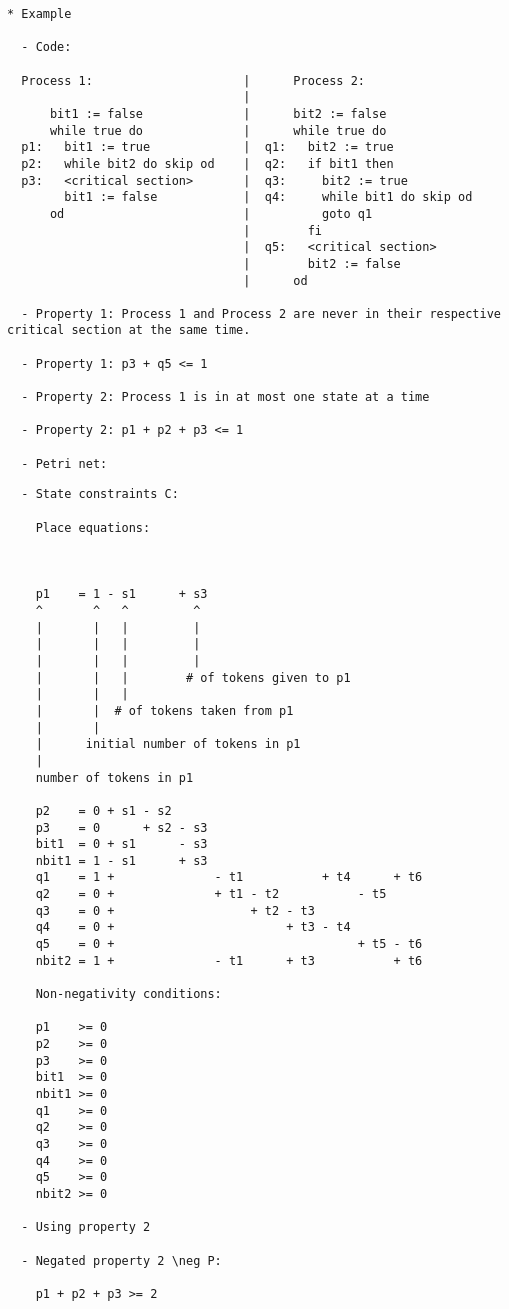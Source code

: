 \begin{verbatim}
* Example

  - Code:

  Process 1:                     |      Process 2:
                                 |
      bit1 := false              |      bit2 := false
      while true do              |      while true do
  p1:   bit1 := true             |  q1:   bit2 := true
  p2:   while bit2 do skip od    |  q2:   if bit1 then
  p3:   <critical section>       |  q3:     bit2 := true
        bit1 := false            |  q4:     while bit1 do skip od
      od                         |          goto q1
                                 |        fi
                                 |  q5:   <critical section>
                                 |        bit2 := false
                                 |      od

  - Property 1: Process 1 and Process 2 are never in their respective critical section at the same time.

  - Property 1: p3 + q5 <= 1

  - Property 2: Process 1 is in at most one state at a time

  - Property 2: p1 + p2 + p3 <= 1

  - Petri net:

\end{verbatim}



\newpage

\begin{verbatim}
  - State constraints C:

    Place equations:
  


    p1    = 1 - s1      + s3
    ^       ^   ^         ^
    |       |   |         |
    |       |   |         |
    |       |   |         |
    |       |   |        # of tokens given to p1
    |       |   |    
    |       |  # of tokens taken from p1
    |       |
    |      initial number of tokens in p1
    |
    number of tokens in p1

    p2    = 0 + s1 - s2
    p3    = 0      + s2 - s3
    bit1  = 0 + s1      - s3
    nbit1 = 1 - s1      + s3
    q1    = 1 +              - t1           + t4      + t6
    q2    = 0 +              + t1 - t2           - t5
    q3    = 0 +                   + t2 - t3
    q4    = 0 +                        + t3 - t4
    q5    = 0 +                                  + t5 - t6
    nbit2 = 1 +              - t1      + t3           + t6
    
    Non-negativity conditions:
  
    p1    >= 0
    p2    >= 0
    p3    >= 0
    bit1  >= 0
    nbit1 >= 0
    q1    >= 0
    q2    >= 0
    q3    >= 0
    q4    >= 0
    q5    >= 0
    nbit2 >= 0

  - Using property 2
  
  - Negated property 2 \neg P:

    p1 + p2 + p3 >= 2
\end{verbatim}


